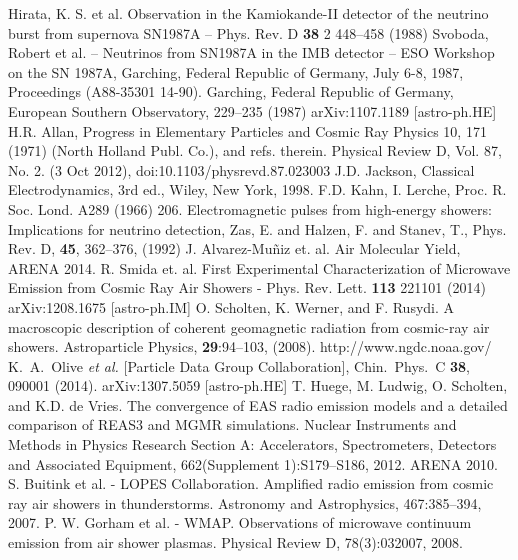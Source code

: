 \begin{thebibliography}{1}

 Hirata, K. S. et al. Observation in the Kamiokande-II detector of the neutrino burst from supernova SN1987A -- Phys. Rev. D \textbf{38} 2 448--458 (1988)
Svoboda, Robert et al. -- Neutrinos from SN1987A in the IMB detector -- ESO Workshop on the SN 1987A, Garching, Federal Republic of Germany, July 6-8, 1987, Proceedings (A88-35301 14-90). Garching, Federal Republic of Germany, European Southern Observatory,  229--235 (1987)
 arXiv:1107.1189 [astro-ph.HE]
 H.R. Allan, Progress in Elementary Particles and Cosmic Ray Physics 10, 171 (1971) (North Holland Publ. Co.), and refs. therein.
 Physical Review D, Vol. 87, No. 2. (3 Oct 2012), doi:10.1103/physrevd.87.023003 
 J.D. Jackson, Classical Electrodynamics, 3rd ed., Wiley, New York, 1998.
 F.D. Kahn, I. Lerche, Proc. R. Soc. Lond. A289 (1966) 206.
 Electromagnetic pulses from high-energy showers: Implications for neutrino detection, Zas, E. and Halzen, F. and Stanev, T., Phys. Rev. D, \textbf{45}, 362--376, (1992)
 J. Alvarez-Mu\~niz et. al. Air Molecular Yield, ARENA 2014.
 R. Smida et. al. First Experimental Characterization of Microwave Emission from Cosmic Ray Air Showers - Phys. Rev. Lett. \textbf{113} 221101 (2014)
 arXiv:1208.1675 [astro-ph.IM]
 O. Scholten, K. Werner, and F. Rusydi. A macroscopic description of coherent geomagnetic radiation from cosmic-ray air showers. Astroparticle Physics, {\bf 29}:94–103, (2008).
 http://www.ngdc.noaa.gov/
 K.~A.~Olive {\it et al.}  [Particle Data Group Collaboration], Chin.\ Phys.\ C {\bf 38}, 090001 (2014).
 arXiv:1307.5059 [astro-ph.HE]
 T. Huege, M. Ludwig, O. Scholten, and K.D. de Vries. The convergence of EAS radio emission models and a detailed comparison of REAS3 and MGMR simulations. Nuclear Instruments and Methods in Physics Research Section A: Accelerators, Spectrometers, Detectors and Associated Equipment, 662(Supplement 1):S179–S186, 2012. ARENA 2010.
 S. Buitink et al. - LOPES Collaboration. Amplified radio emission from cosmic ray air showers in thunderstorms. Astronomy and Astrophysics, 467:385–394, 2007.
 P. W. Gorham et al. - WMAP. Observations of microwave continuum emission from air shower plasmas. Physical Review D, 78(3):032007, 2008.

\end{thebibliography}
